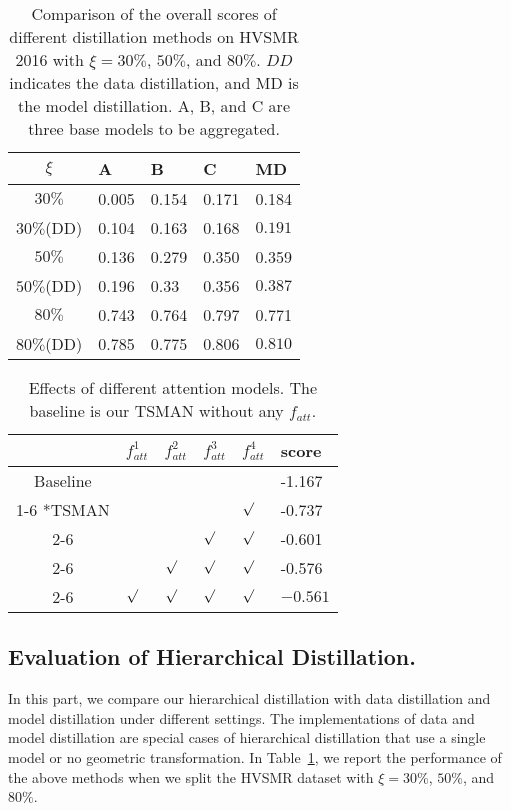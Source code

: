 \documentclass[letterpaper]{article} %
\begin{document}
\begin{table}[h]
\footnotesize
\begin{center}
\caption{Comparison of the overall scores of different distillation methods on HVSMR 2016 with $\xi=30\%$, $50\%$, and $80\%$. $DD$ indicates the data distillation, and MD is the model distillation. A, B, and C are three base models to be aggregated.} \label{tab:hd-score}
\begin{tabular}{c|p{0.7cm}|p{0.7cm}|p{0.7cm}|p{0.7cm}}
  \hline
  $\xi$&A&B&C&MD \\
  \hline
  $30\%$&0.005&0.154&0.171&0.184\\
  $30\%$(DD)&0.104&0.163&0.168&$\mathbf{0.191}$\\
  \hline
  $50\%$&0.136&0.279&0.350&0.359\\
  $50\%$(DD)&0.196&0.33&0.356&$\mathbf{0.387}$\\
  \hline
  $80\%$&0.743&0.764&0.797&0.771\\
  $80\%$(DD)&0.785&0.775&0.806&$\mathbf{0.810}$\\
  \hline
\end{tabular}
\end{center}
\end{table}\begin{table}[h]
\footnotesize
\begin{center}
\caption{Effects of different attention models. The baseline is our TSMAN without any $f_{att}$.} \label{tab:dan}
\begin{tabular}{c|p{0.7cm}|p{0.7cm}|p{0.7cm}|p{0.7cm}|p{0.85cm}}
  \hline
  &$f_{att}^1$&$f_{att}^2$&$f_{att}^3$&$f_{att}^4$&score \\
  \hline
  Baseline&&&&&-1.167\\
  \cline{1-6}
  \multirow{4}*{TSMAN}&&&&$\surd$&-0.737\\
  \cline{2-6}
  &&&$\surd$&$\surd$&-0.601\\
  \cline{2-6}
  &&$\surd$&$\surd$&$\surd$&-0.576\\
  \cline{2-6}
  &$\surd$&$\surd$&$\surd$&$\surd$&$\mathbf{-0.561}$\\
  \hline
\end{tabular}
\end{center}
\end{table}\subsection{Evaluation of Hierarchical Distillation.}
In this part, we compare our hierarchical distillation with data distillation \cite{Radosavovic_2018_CVPR} and model distillation \cite{Hansen1990} under different settings.
The implementations of data and model distillation are special cases of hierarchical distillation that use a single model or no geometric transformation.
In Table~\ref{tab:hd-score}, we report the performance of the above methods when we split the HVSMR dataset with $\xi=30\%$, $50\%$, and $80\%$.
\end{document}
